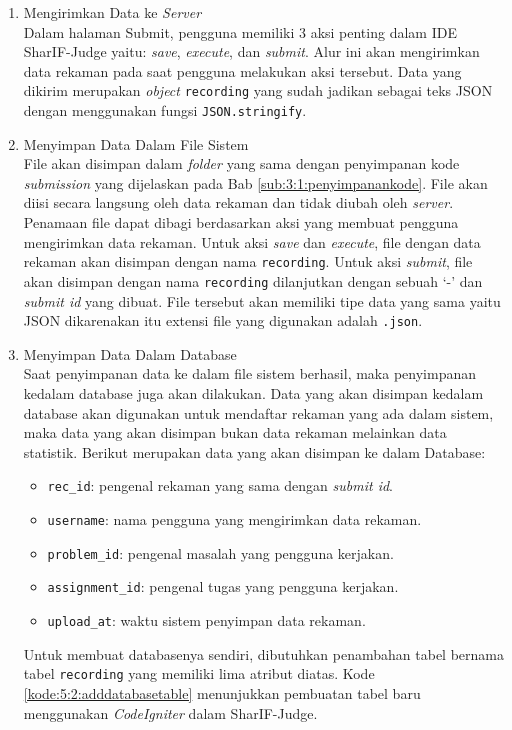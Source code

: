 \begin{enumerate}
    \item Mengirimkan Data ke \textit{Server} \\
    Dalam halaman Submit, pengguna memiliki 3 aksi penting dalam IDE SharIF-Judge yaitu: \textit{save}, \textit{execute}, dan \textit{submit}. Alur ini akan mengirimkan data rekaman pada saat pengguna melakukan aksi tersebut. Data yang dikirim merupakan \textit{object} \verb|recording| yang sudah jadikan sebagai teks JSON dengan menggunakan fungsi \verb|JSON.stringify|.

    \item Menyimpan Data Dalam File Sistem \\
    File akan disimpan dalam \textit{folder} yang sama dengan penyimpanan kode \textit{submission} yang dijelaskan pada Bab \ref{sub:3:1:penyimpanankode}. File akan diisi secara langsung oleh data rekaman dan tidak diubah oleh \textit{server}. Penamaan file dapat dibagi berdasarkan aksi yang membuat pengguna mengirimkan data rekaman. Untuk aksi \textit{save} dan \textit{execute}, file dengan data rekaman akan disimpan dengan nama \verb|recording|. Untuk aksi \textit{submit}, file akan disimpan dengan nama \verb|recording| dilanjutkan dengan sebuah `-' dan \textit{submit id} yang dibuat. File tersebut akan memiliki tipe data yang sama yaitu JSON dikarenakan itu extensi file yang digunakan adalah \verb|.json|.
 
    \item Menyimpan Data Dalam Database \\
    Saat penyimpanan data ke dalam file sistem berhasil, maka penyimpanan kedalam database juga akan dilakukan. Data yang akan disimpan kedalam database akan digunakan untuk mendaftar rekaman yang ada dalam sistem, maka data yang akan disimpan bukan data rekaman melainkan data statistik. Berikut merupakan data yang akan disimpan ke dalam Database:
    \begin{itemize}
        \item \verb|rec_id|: pengenal rekaman yang sama dengan \textit{submit id}.  
        \item \verb|username|: nama pengguna yang mengirimkan data rekaman.
        \item \verb|problem_id|: pengenal masalah yang pengguna kerjakan.
        \item \verb|assignment_id|: pengenal tugas yang pengguna kerjakan.
        \item \verb|upload_at|: waktu sistem penyimpan data rekaman.
    \end{itemize}
    Untuk membuat databasenya sendiri, dibutuhkan penambahan tabel bernama tabel \verb|recording| yang memiliki lima atribut diatas. Kode \ref{kode:5:2:adddatabasetable} menunjukkan pembuatan tabel baru menggunakan \textit{CodeIgniter} dalam SharIF-Judge.


\end{enumerate}
